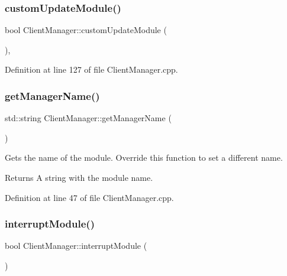 \subsubsection{\texorpdfstring{custom\+Update\+Module()}{customUpdateModule()}}
{\footnotesize\ttfamily bool Client\+Manager\+::custom\+Update\+Module (\begin{DoxyParamCaption}{ }\end{DoxyParamCaption})\hspace{0.3cm}{\ttfamily [protected]}, {\ttfamily [virtual]}}



Definition at line 127 of file Client\+Manager.\+cpp.

\hypertarget{classocra__recipes_1_1ClientManager_a3fd7aa39812c9ffdb32b732c4f854862}{}\label{classocra__recipes_1_1ClientManager_a3fd7aa39812c9ffdb32b732c4f854862} 
\subsubsection{\texorpdfstring{get\+Manager\+Name()}{getManagerName()}}
{\footnotesize\ttfamily std\+::string Client\+Manager\+::get\+Manager\+Name (\begin{DoxyParamCaption}{ }\end{DoxyParamCaption})\hspace{0.3cm}{\ttfamily [virtual]}}

Gets the name of the module. Override this function to set a different name. \begin{DoxyReturn}{Returns}
A string with the module name. 
\end{DoxyReturn}


Definition at line 47 of file Client\+Manager.\+cpp.

\hypertarget{classocra__recipes_1_1ClientManager_a3724b1ba55a2a0e81774aa674f567e34}{}\label{classocra__recipes_1_1ClientManager_a3724b1ba55a2a0e81774aa674f567e34} 
\subsubsection{\texorpdfstring{interrupt\+Module()}{interruptModule()}}
{\footnotesize\ttfamily bool Client\+Manager\+::interrupt\+Module (\begin{DoxyParamCaption}{ }\end{DoxyParamCaption})}


